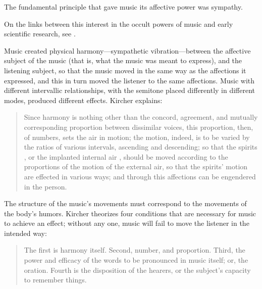 The fundamental principle that gave music its affective power was sympathy.%
\begin{Footnote}
    On the links between this interest in the occult powers of music and early 
    scientific research, see \autocites{Gouk:Sciences}{Gouk:Harmonics}.
\end{Footnote}
Music created physical harmony---sympathetic vibration---between the affective 
subject of the music (that is, what the music was meant to express), and the 
listening subject, so that the music moved in the same way as the affections it 
expressed, and this in turn moved the listener to the same affections.
Music with different intervallic relationships, with the semitone placed 
differently in different modes, produced different effects.
Kircher explains:
\begin{quote}
    Since harmony is nothing other than the concord, agreement, and mutually 
    corresponding proportion between dissimilar voices,
    this proportion, then, of numbers, sets the air in motion;
    the motion, indeed, is to be varied by the ratios of various intervals, 
    ascending and descending;
    so that the spirits , or the implanted 
    internal air \Dots{}, should be moved according to the 
    proportions of the motion of the external air, so that the spirits' motion are 
    effected in various ways; and through this affections can be engendered in the 
    person.%
        \Autocite
        [552: .]
        {Kircher:Musurgia}
\end{quote}

The structure of the music's movements must correspond to the movements of the 
body's humors.
Kircher theorizes four conditions that are necessary for music to achieve an 
effect; without any one, music will fail to move the listener in the intended 
way:
\begin{quote}
    The first is harmony itself.
    Second, number, and proportion.
    Third, the power and efficacy of the words to be pronounced in music itself; 
    or, the oration.
    Fourth is the disposition of the hearers, or the subject's capacity to 
    remember things.%
    \Autocite
    [550: .]
    {Kircher:Musurgia}
\end{quote}

